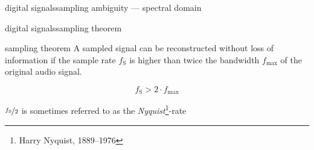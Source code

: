         \begin{frame}{digital signals}{sampling ambiguity --- spectral domain}
        \end{frame}	
        \begin{frame}{digital signals}{sampling theorem}
            \toremember{}
            
            \begin{block}{sampling theorem}
                A sampled signal can be reconstructed without loss of information if the sample rate $f_\mathrm{S}$ is higher than twice the bandwidth $f_\mathrm{max}$ of the original audio signal.
                
                \begin{equation*}
                    f_\mathrm{S} > 2\cdot f_\mathrm{max}
                \end{equation*}
            \end{block}
            
            \pause
            \bigskip
            $\nicefrac{f_\mathrm{S}}{2}$ is sometimes referred to as the \textit{Nyquist}\footnote{\tiny Harry Nyquist, 1889--1976}-rate
        \end{frame}	

